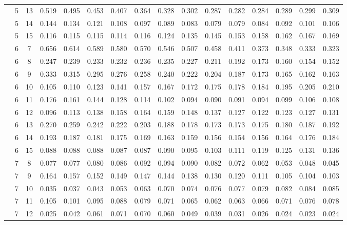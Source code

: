 \documentclass[useAMS,usenatbib]{mn2e}
\begin{document}
\begin{longtable}{cccccccccccccccc}
 &  5 & 13 & 0.519 & 0.495 & 0.453 & 0.407 & 0.364 & 0.328 & 0.302 & 0.287 & 0.282 & 0.284 & 0.289 & 0.299 & 0.309 \\
 &  5 & 14 & 0.144 & 0.134 & 0.121 & 0.108 & 0.097 & 0.089 & 0.083 & 0.079 & 0.079 & 0.084 & 0.092 & 0.101 & 0.106 \\
 &  5 & 15 & 0.116 & 0.115 & 0.115 & 0.114 & 0.116 & 0.124 & 0.135 & 0.145 & 0.153 & 0.158 & 0.162 & 0.167 & 0.169 \\
 &  6 &  7 & 0.656 & 0.614 & 0.589 & 0.580 & 0.570 & 0.546 & 0.507 & 0.458 & 0.411 & 0.373 & 0.348 & 0.333 & 0.323 \\
 &  6 &  8 & 0.247 & 0.239 & 0.233 & 0.232 & 0.236 & 0.235 & 0.227 & 0.211 & 0.192 & 0.173 & 0.160 & 0.154 & 0.152 \\
 &  6 &  9 & 0.333 & 0.315 & 0.295 & 0.276 & 0.258 & 0.240 & 0.222 & 0.204 & 0.187 & 0.173 & 0.165 & 0.162 & 0.163 \\
 &  6 & 10 & 0.105 & 0.110 & 0.123 & 0.141 & 0.157 & 0.167 & 0.172 & 0.175 & 0.178 & 0.184 & 0.195 & 0.205 & 0.210 \\
 &  6 & 11 & 0.176 & 0.161 & 0.144 & 0.128 & 0.114 & 0.102 & 0.094 & 0.090 & 0.091 & 0.094 & 0.099 & 0.106 & 0.108 \\
 &  6 & 12 & 0.096 & 0.113 & 0.138 & 0.158 & 0.164 & 0.159 & 0.148 & 0.137 & 0.127 & 0.122 & 0.123 & 0.127 & 0.131 \\
 &  6 & 13 & 0.270 & 0.259 & 0.242 & 0.222 & 0.203 & 0.188 & 0.178 & 0.173 & 0.173 & 0.175 & 0.180 & 0.187 & 0.192 \\
 &  6 & 14 & 0.193 & 0.187 & 0.181 & 0.175 & 0.169 & 0.163 & 0.159 & 0.156 & 0.154 & 0.156 & 0.164 & 0.176 & 0.184 \\
 &  6 & 15 & 0.088 & 0.088 & 0.088 & 0.087 & 0.087 & 0.090 & 0.095 & 0.103 & 0.111 & 0.119 & 0.125 & 0.131 & 0.136 \\
 &  7 &  8 & 0.077 & 0.077 & 0.080 & 0.086 & 0.092 & 0.094 & 0.090 & 0.082 & 0.072 & 0.062 & 0.053 & 0.048 & 0.045 \\
 &  7 &  9 & 0.164 & 0.157 & 0.152 & 0.149 & 0.147 & 0.144 & 0.138 & 0.130 & 0.120 & 0.111 & 0.105 & 0.104 & 0.103 \\
 &  7 & 10 & 0.035 & 0.037 & 0.043 & 0.053 & 0.063 & 0.070 & 0.074 & 0.076 & 0.077 & 0.079 & 0.082 & 0.084 & 0.085 \\
 &  7 & 11 & 0.105 & 0.101 & 0.095 & 0.088 & 0.079 & 0.071 & 0.065 & 0.062 & 0.063 & 0.066 & 0.071 & 0.076 & 0.078 \\
 &  7 & 12 & 0.025 & 0.042 & 0.061 & 0.071 & 0.070 & 0.060 & 0.049 & 0.039 & 0.031 & 0.026 & 0.024 & 0.023 & 0.024 \\

\end{longtable}
\end{document}
